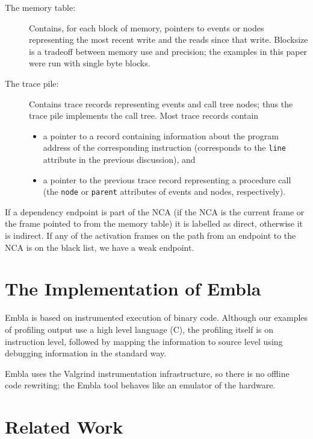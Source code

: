 \documentclass{acm_proc_article-sp}
\begin{document}
\begin{description}
\item[The memory table:]
Contains, for each block of memory, pointers to events or nodes representing
the most recent write and the reads since that write. 
Blocksize is a tradeoff between memory use and precision; the examples in 
this paper were run with single byte blocks. 
\item[The trace pile:]
Contains trace records representing events and call tree nodes; thus the 
trace pile implements the call tree. Most trace records contain 
\begin{itemize}
\item
a pointer to a record containing information about the program 
address of the corresponding instruction (corresponds to the {\tt line} 
attribute in the previous discussion), and
\item
a pointer to the previous trace record representing a procedure call (the 
{\tt node} or {\tt parent} attributes of events and nodes, respectively).
\end{itemize}
\end{description}

If a dependency endpoint is part of the NCA (if the NCA is the current
frame or the frame pointed to from the memory table) it is labelled as
direct, otherwise it is indirect. If any of the activation frames on
the path from an endpoint to the NCA is on the black list, we have a
weak endpoint.




\section{The Implementation of Embla}

Embla is based on instrumented execution of binary code. Although
our examples of profiling output use a high level language (C),
the profiling itself is on instruction level, followed by 
mapping the information to source level using debugging information 
in the standard way.

Embla uses the Valgrind instrumentation infrastructure, so there
is no offline code rewriting; the Embla tool behaves like an emulator
of the hardware.

\section{Related Work}
\end{document}
